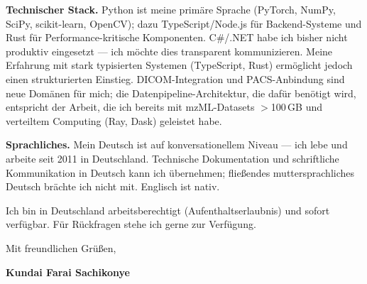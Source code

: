 \documentclass[12pt,a4paper]{article}
\begin{document}
\textbf{Technischer Stack.}
Python ist meine primäre Sprache (PyTorch, NumPy, SciPy, scikit-learn, OpenCV);
dazu TypeScript/Node.js für Backend-Systeme und Rust für Performance-kritische
Komponenten. C\#/.NET habe ich bisher nicht produktiv eingesetzt --- ich möchte
dies transparent kommunizieren. Meine Erfahrung mit stark typisierten Systemen
(TypeScript, Rust) ermöglicht jedoch einen strukturierten Einstieg. DICOM-Integration
und PACS-Anbindung sind neue Domänen für mich; die Datenpipeline-Architektur,
die dafür benötigt wird, entspricht der Arbeit, die ich bereits mit mzML-Datasets
$>$100\,GB und verteiltem Computing (Ray, Dask) geleistet habe.

\textbf{Sprachliches.}
Mein Deutsch ist auf konversationellem Niveau --- ich lebe und arbeite seit 2011
in Deutschland. Technische Dokumentation und schriftliche Kommunikation in Deutsch
kann ich übernehmen; fließendes muttersprachliches Deutsch brächte ich nicht mit.
Englisch ist nativ.

Ich bin in Deutschland arbeitsberechtigt (Aufenthaltserlaubnis) und sofort
verfügbar. Für Rückfragen stehe ich gerne zur Verfügung.

\vspace{1.5em}
Mit freundlichen Grüßen,

\vspace{2.5em}
\textbf{Kundai Farai Sachikonye}
\end{document}
